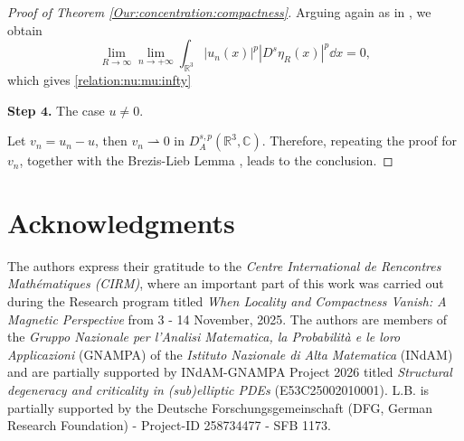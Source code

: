 \documentclass[leqno,11pt]{amsart}
\newcommand{\R}{\mathbb R}
\newcommand{\C}{\mathbb C}
\numberwithin{equation}{section}
\newcommand{\weakto}{\rightharpoonup}
\begin{document}
\begin{proof}[Proof of Theorem \ref{Our:concentration:compactness}]
Arguing again as in \cite{BonderSaintierSilva}, we obtain
\begin{equation}\label{uk:Ds:to:0}
\lim_{R\to\infty} \lim_{n \to +\infty} \int_{\R^3}|u_n(x)|^p|D^s\eta_R(x)|^p\dd x = 0,
\end{equation}
which gives \eqref{relation:nu:mu:infty}





{\bf Step $\mathbf{4}$.} The case $u\neq 0$.

Let $v_n=u_n-u$, then $v_n \weakto 0$ in $D^{s,p}_A(\R^3,\C)$. Therefore, repeating the proof for $v_n$, together with the Brezis-Lieb Lemma \cite[Theorem 1]{BrezisLieb}, leads to the conclusion.

\end{proof}




\section*{Acknowledgments}

The authors express their gratitude to the {\em Centre International de Rencontres Math\'ematiques (CIRM)}, where an important part of this work was carried out during the Research program titled \textit{When Locality and Compactness Vanish: A Magnetic Perspective} from 3 - 14 November, 2025.
The authors are members of the {\em Gruppo Nazionale per l'Analisi Ma\-te\-ma\-ti\-ca, la Probabilit\`a e le loro Applicazioni} (GNAMPA) of the {\em Istituto Nazionale di Alta Matematica} (INdAM) and are partially supported by INdAM-GNAMPA Project 2026 titled \textit{Structural degeneracy and criticality in (sub)elliptic PDEs} (E53C25002010001). L.B. is partially supported by the Deutsche Forschungsgemeinschaft (DFG, German Research Foundation) - Project-ID 258734477 - SFB 1173.





\end{document}
